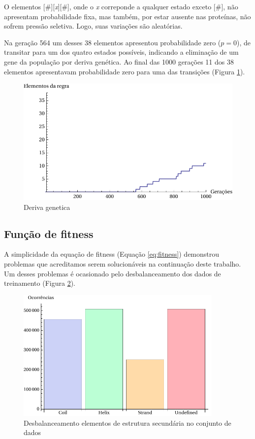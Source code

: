 O elementos [\#][\textit{x}][\#], onde o \textit{x} correponde a qualquer estado exceto [\#], não apresentam probabilidade fixa, mas também, por estar ausente nas proteínas, não sofrem pressão seletiva. Logo, suas variações são aleatórias.

Na geração 564 um desses 38 elementos apresentou probabilidade zero ($p=0$), de transitar para um dos quatro estados possíveis, indicando a eliminação de um gene da população por deriva genética. Ao final das 1000 gerações 11 dos 38 elementos apresentavam probabilidade zero para uma das transições (Figura \ref{fig:deriva_genetica}).

\begin{figure}
  \centering
  \includegraphics[width=1\textwidth]{figures/deriva_genetica.pdf}
  \caption{Deriva genetica}
        \label{fig:deriva_genetica}
\end{figure}

\subsection{Função de fitness}

A simplicidade da equação de fitness (Equação \ref{eq:fitness}) demonstrou problemas que acreditamos serem solucionáveis na continuação deste trabalho. Um desses problemas é ocasionado pelo desbalanceamento dos dados de treinamento (Figura \ref{fig:occ_ss}). 

\begin{figure}
  \centering
  \includegraphics[width=0.9\textwidth]{figures/occ_ss.pdf}
  \caption{Desbalanceamento elementos de estrutura secundária no conjunto de dados}
        \label{fig:occ_ss}
\end{figure}

